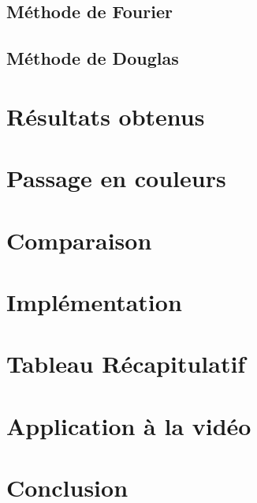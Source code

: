 \documentclass{article}
\begin{document}
\subsection{Méthode de Fourier \cite{Image}}

\subsection{Méthode de Douglas \cite{Douglas}}

\section{Résultats obtenus}

\section{Passage en couleurs}

\section{Comparaison}

\section{Implémentation}

\section{Tableau Récapitulatif}

\section{Application à la vidéo}

\section{Conclusion}



\end{document}
